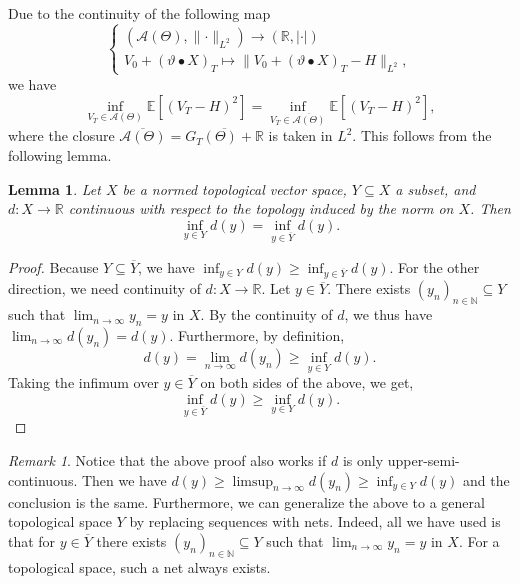 \documentclass[11pt,a4paper,twoside,openany]{report}
\numberwithin{equation}{section}
\theoremstyle{plain} %
\newtheorem{lemma}[theorem]{Lemma}
\theoremstyle{definition} %
\theoremstyle{remark} %
\newtheorem{remark}[theorem]{Remark}
\begin{document}
Due to the continuity of the following map
\begin{equation*}
\begin{cases}
    (\mathcal{A}(\Theta),\lVert\cdot\rVert_{L^2})\to(\mathbb{R},|\cdot|)\\
    V_0+(\vartheta\bullet X)_T\mapsto\lVert V_0+(\vartheta\bullet X)_T-H\rVert_{L^2},
\end{cases}
\end{equation*}
we have 
\begin{equation}\label{eq:mean squared hedging over closure}
\inf_{V_T\in\mathcal{A}(\Theta)}\mathbb{E}[(V_T-H)^2]=\inf_{V_T\in \overline{\mathcal{A}(\Theta)}}\mathbb{E}[(V_T-H)^2],
\end{equation}
where the closure \(\overline{\mathcal{A}(\Theta)}=\overline{G_T(\Theta)+\mathbb{R}}\) is taken in \(L^2\). 
This follows from the following lemma.
\begin{lemma}\label{lemma:minimization of closure}
     Let \(X\) be a normed topological vector space, \(Y\subseteq X\) a subset, and \(d:X\to\mathbb{R}\) continuous with respect to the topology induced by the norm on \(X\). Then 
     \begin{equation*}
         \inf_{y\in Y} d(y)=\inf_{y\in\overline{Y}} d(y).
     \end{equation*}
\end{lemma}
\begin{proof}
 Because \(Y\subseteq\overline{Y}\), we have \(\inf_{y\in Y} d(y)\geq\inf_{y\in\overline{Y}} d(y)\). For the other direction, we need continuity of \(d:X\to\mathbb{R}\). Let \(y\in\overline{Y}\). There exists \((y_n)_{n\in\mathbb{N}}\subseteq Y\) such that \(\lim_{n\to\infty}y_n = y\) in \(X\). By the continuity of \(d\), we thus have \(\lim_{n\to\infty}d(y_n) = d(y)\). Furthermore, by definition,
    \begin{equation*}
        d(y)=\lim_{n\to\infty}d(y_n)\geq\inf_{y\in Y} d(y).
    \end{equation*}
    Taking the infimum over \(y\in\overline{Y}\) on both sides of the above, we get,
    \begin{equation*}
        \inf_{y\in\overline{Y}} d(y) \geq \inf_{y\in Y} d(y).
    \end{equation*}
\end{proof}
\begin{remark}
   Notice that the above proof also works if \(d\) is only upper-semi-continuous. Then we have \(d(y)\geq\limsup_{n\to\infty}{d(y_n)}\geq\inf_{y\in Y}d(y)\) and the conclusion is the same. Furthermore, we can generalize the above to a general topological space \(Y\) by replacing sequences with nets. Indeed, all we have used is that for \(y\in\overline{Y}\) there exists \((y_n)_{n\in\mathbb{N}}\subseteq Y\) such that \(\lim_{n\to\infty}y_n = y\) in \(X\). For a topological space, such a net always exists.
\end{remark}
\end{document}
